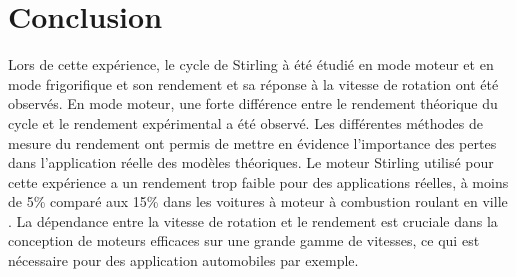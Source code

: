 \section{Conclusion}

Lors de cette expérience, le cycle de Stirling à été étudié en mode moteur et en mode frigorifique et son rendement et sa réponse à la vitesse de rotation ont été observés. En mode moteur, une forte différence entre le rendement théorique du cycle et le rendement expérimental a été observé. Les différentes méthodes de mesure du rendement ont permis de mettre en évidence l'importance des pertes dans l'application réelle des modèles théoriques. Le moteur Stirling utilisé pour cette expérience a un rendement trop faible pour des applications réelles, à moins de 5\% comparé aux 15\% dans les voitures à moteur à combustion roulant en ville \cite{voiture}. La dépendance entre la vitesse de rotation et le rendement est cruciale dans la conception de moteurs efficaces sur une grande gamme de vitesses, ce qui est nécessaire pour des application automobiles par exemple.
